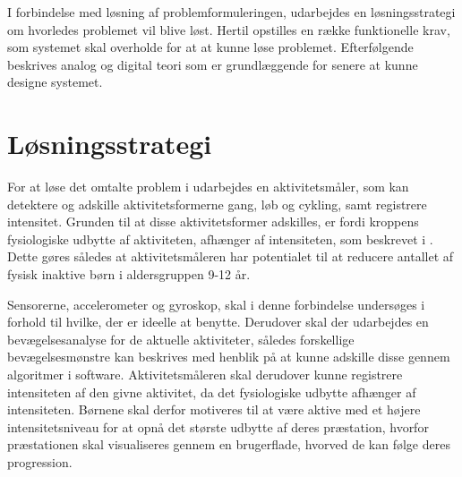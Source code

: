 I forbindelse med løsning af problemformuleringen, udarbejdes en løsningsstrategi om hvorledes problemet vil blive løst. Hertil opstilles en række funktionelle krav, som systemet skal overholde for at at kunne løse problemet. Efterfølgende beskrives analog og digital teori som er grundlæggende for senere at kunne designe systemet.

\section{Løsningsstrategi}

For at løse det omtalte problem i  udarbejdes en aktivitetsmåler, som kan detektere og adskille aktivitetsformerne gang, løb og cykling, samt registrere intensitet. Grunden til at disse aktivitetsformer adskilles, er fordi kroppens fysiologiske udbytte af aktiviteten, afhænger af intensiteten, som beskrevet i . Dette gøres således at aktivitetsmåleren har potentialet til at reducere antallet af fysisk inaktive børn i aldersgruppen 9-12 år.

Sensorerne, accelerometer og gyroskop, skal i denne forbindelse undersøges i forhold til hvilke, der er ideelle at benytte. Derudover skal der udarbejdes en bevægelsesanalyse for de aktuelle aktiviteter, således forskellige bevægelsesmønstre kan beskrives med henblik på at kunne adskille disse gennem algoritmer i software. Aktivitetsmåleren skal derudover kunne registrere intensiteten af den givne aktivitet, da det fysiologiske udbytte afhænger af intensiteten. Børnene skal derfor motiveres til at være aktive med et højere intensitetsniveau for at opnå det største udbytte af deres præstation, hvorfor præstationen skal visualiseres gennem en brugerflade, hvorved de kan følge deres progression.





